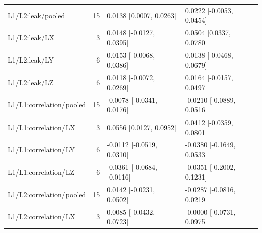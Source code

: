 \begin{longtable}{@{}p{1.8in}rl l@{}}
L1/\allowbreak L2:leak/\allowbreak pooled & 15 & 0.0138 [0.0007, 0.0263] & 0.0222 [-0.0053, 0.0454]\\
L1/\allowbreak L2:leak/\allowbreak LX & 3 & 0.0148 [-0.0127, 0.0395] & 0.0504 [0.0337, 0.0780]\\
L1/\allowbreak L2:leak/\allowbreak LY & 6 & 0.0153 [-0.0068, 0.0386] & 0.0138 [-0.0468, 0.0679]\\
L1/\allowbreak L2:leak/\allowbreak LZ & 6 & 0.0118 [-0.0072, 0.0269] & 0.0164 [-0.0157, 0.0497]\\
L1/\allowbreak L1:correlation/\allowbreak pooled & 15 & -0.0078 [-0.0341, 0.0176] & -0.0210 [-0.0889, 0.0516]\\
L1/\allowbreak L1:correlation/\allowbreak LX & 3 & 0.0556 [0.0127, 0.0952] & 0.0412 [-0.0359, 0.0801]\\
L1/\allowbreak L1:correlation/\allowbreak LY & 6 & -0.0112 [-0.0519, 0.0310] & -0.0380 [-0.1649, 0.0533]\\
L1/\allowbreak L1:correlation/\allowbreak LZ & 6 & -0.0361 [-0.0684, -0.0116] & -0.0351 [-0.2002, 0.1231]\\
L1/\allowbreak L2:correlation/\allowbreak pooled & 15 & 0.0142 [-0.0231, 0.0502] & -0.0287 [-0.0816, 0.0219]\\
L1/\allowbreak L2:correlation/\allowbreak LX & 3 & 0.0085 [-0.0432, 0.0723] & -0.0000 [-0.0731, 0.0975]\\

\end{longtable}
